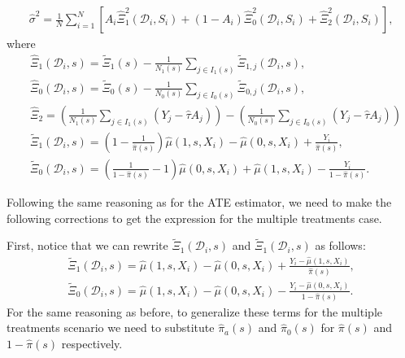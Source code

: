 \documentclass{article}
\begin{document}
\begin{align}
	\hat{\sigma}^2 = \frac{1}{N} \sum_{i=1}^N \left[A_i\hat{\Xi}_{1}^2(\mathcal D_i, S_i) + (1- A_i) \hat{\Xi}_{0}^2(\mathcal D_i, S_i) + \hat{\Xi}_2^2(\mathcal D_i, S_i) \right], \nonumber
\end{align}
where 
\begin{align}
	&\hat{\Xi}_{1}(\mathcal D_i, s) = \tilde{\Xi}_{1}(s) - \frac{1}{N_1(s)} \sum_{j \in I_1(s)} \tilde{\Xi}_{1,j}(\mathcal D_i, s) \nonumber, \\
	&\hat{\Xi}_{0}(\mathcal D_i, s) = \tilde{\Xi}_{0}(s) - \frac{1}{N_0(s)} \sum_{j \in I_0(s)} \tilde{\Xi}_{0,j}(\mathcal D_i, s) \nonumber , \\
	& \hat{\Xi}_2 = \left(\frac{1}{N_1(s)} \sum_{j \in I_1(s)} (Y_j - \hat{\tau} A_j) \right) - \left(\frac{1}{N_0(s)} \sum_{j \in I_0(s)} (Y_j - \hat{\tau} A_j)\right) \nonumber \\
	&\tilde{\Xi}_{1}(\mathcal D_i, s) = \left(1 - \frac{1}{\hat{\pi}(s)} \right) \hat{\mu}(1,s,X_i) - \hat{\mu}(0,s,X_i) + \frac{Y_i}{\hat{\pi}(s)}, \nonumber \\
	& \tilde{\Xi}_{0}(\mathcal D_i, s) = \left(\frac{1}{1 - \hat{\pi}(s)} - 1 \right) \hat{\mu}(0,s,X_i) + \hat{\mu}(1,s,X_i) - \frac{Y_i}{1-\hat{\pi}(s)}. \nonumber
\end{align}

Following the same reasoning as for the ATE estimator, we need to make the following corrections to get the expression for the multiple treatments case.

First, notice that we can rewrite $\tilde{\Xi}_{1}(\mathcal D_i, s)$ and $\tilde{\Xi}_{1}(\mathcal D_i, s)$ as follows:
\begin{align}
\tilde{\Xi}_1(\mathcal D_i,s) = \hat{\mu}(1,s,X_i) - \hat{\mu}(0,s,X_i) + \frac{Y_i - \hat{\mu}(1,s,X_i)}{\hat{\pi}(s)}, \nonumber \\
\tilde{\Xi}_0(\mathcal D_i,s) = \hat{\mu}(1,s,X_i) - \hat{\mu}(0,s,X_i) - \frac{Y_i - \hat{\mu}(0,s,X_i)}{1 - \hat{\pi}(s)} \nonumber.
\end{align}
For the same reasoning as before, to generalize these terms for the multiple treatments scenario we need to substitute $\hat{\pi}_a(s)$ and $\hat{\pi}_0(s)$ for $\hat{\pi}(s)$ and $1 - \hat{\pi}(s)$ respectively.
\end{document}

